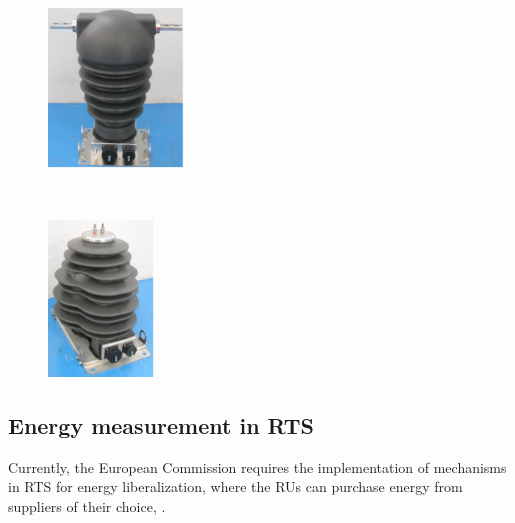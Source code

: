 	\begin{figure}[h!]
		\centering
		\begin{minipage}{0.45\textwidth}
			\centering
			\includegraphics[width=0.32\textwidth,keepaspectratio]{figures/32.EnergyS/current_t}
			\label{fig:current_t}
		\end{minipage}%
		\begin{minipage}{0.05\textwidth}  ~\end{minipage}	
		\begin{minipage}{0.45\textwidth}
			\centering
			\includegraphics[width=0.25\textwidth,keepaspectratio]{figures/32.EnergyS/voltage_t}
			
			
			\label{fig:voltage_t}
		\end{minipage}
	\end{figure}
	
\subsection{Energy measurement in RTS}	
\label{subs:323}

	Currently, the European Commission requires the implementation of mechanisms in \ac{RTS} for energy liberalization, where the \ac{RUs} can purchase energy from suppliers of their choice, \cite{eur-lex2008}.
	
